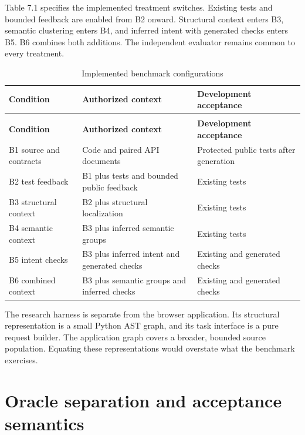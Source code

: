 \documentclass[12pt,a4paper,oneside]{report}
\begin{document}
Table 7.1 specifies the implemented treatment switches. Existing tests and bounded feedback are enabled from B2 onward. Structural context enters B3, semantic clustering enters B4, and inferred intent with generated checks enters B5. B6 combines both additions. The independent evaluator remains common to every treatment.

\begingroup\normalsize\onehalfspacing\setlength{\tabcolsep}{4pt}\renewcommand{\arraystretch}{1.2}
\begin{longtable}{@{}>{\raggedright\arraybackslash}p{}>{\raggedright\arraybackslash}p{}>{\raggedright\arraybackslash}p{}@{}}
\caption{Implemented benchmark configurations}\label{tab:7.1}\\
\toprule
\textbf{Condition} & \textbf{Authorized context} & \textbf{Development acceptance}\\\midrule
\endfirsthead
\multicolumn{3}{l}{\small Table 7.1 continued}\\\toprule
\textbf{Condition} & \textbf{Authorized context} & \textbf{Development acceptance}\\\midrule
\endhead
\bottomrule\endfoot
B1 source and contracts & Code and paired API documents & Protected public tests after generation\\
B2 test feedback & B1 plus tests and bounded public feedback & Existing tests\\
B3 structural context & B2 plus structural localization & Existing tests\\
B4 semantic context & B3 plus inferred semantic groups & Existing tests\\
B5 intent checks & B3 plus inferred intent and generated checks & Existing and generated checks\\
B6 combined context & B3 plus semantic groups and inferred checks & Existing and generated checks\\
\end{longtable}\endgroup

The research harness is separate from the browser application. Its structural representation is a small Python AST graph, and its task interface is a pure request builder. The application graph covers a broader, bounded source population. Equating these representations would overstate what the benchmark exercises.

\section{Oracle separation and acceptance semantics}
\end{document}
